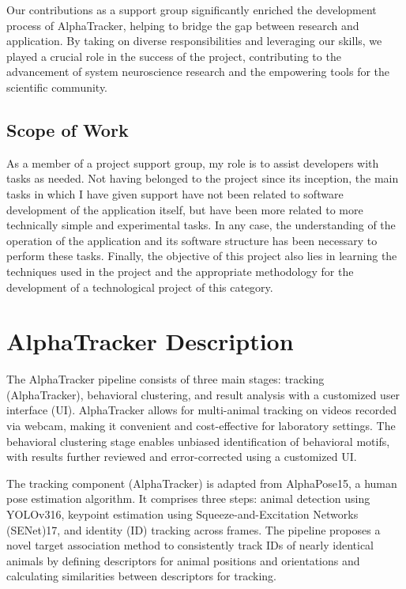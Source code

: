 \documentclass[
  11pt,
]{article}
\begin{document}
Our contributions as a support group significantly enriched the
development process of AlphaTracker, helping to bridge the gap between
research and application. By taking on diverse responsibilities and
leveraging our skills, we played a crucial role in the success of the
project, contributing to the advancement of system neuroscience research
and the empowering tools for the scientific community.

\hypertarget{scope-of-work}{%
\subsection{Scope of Work}\label{scope-of-work}}

As a member of a project support group, my role is to assist developers
with tasks as needed. Not having belonged to the project since its
inception, the main tasks in which I have given support have not been
related to software development of the application itself, but have been
more related to more technically simple and experimental tasks. In any
case, the understanding of the operation of the application and its
software structure has been necessary to perform these tasks. Finally,
the objective of this project also lies in learning the techniques used
in the project and the appropriate methodology for the development of a
technological project of this category.

\hypertarget{alphatracker-description}{%
\section{AlphaTracker Description}\label{alphatracker-description}}

The AlphaTracker pipeline consists of three main stages: tracking
(AlphaTracker), behavioral clustering, and result analysis with a
customized user interface (UI). AlphaTracker allows for multi-animal
tracking on videos recorded via webcam, making it convenient and
cost-effective for laboratory settings. The behavioral clustering stage
enables unbiased identification of behavioral motifs, with results
further reviewed and error-corrected using a customized UI.

The tracking component (AlphaTracker) is adapted from AlphaPose15, a
human pose estimation algorithm. It comprises three steps: animal
detection using YOLOv316, keypoint estimation using
Squeeze-and-Excitation Networks (SENet)17, and identity (ID) tracking
across frames. The pipeline proposes a novel target association method
to consistently track IDs of nearly identical animals by defining
descriptors for animal positions and orientations and calculating
similarities between descriptors for tracking.
\end{document}
